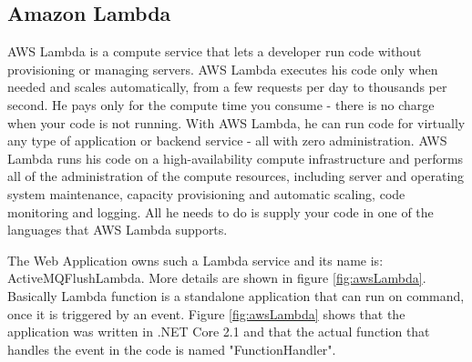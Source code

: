 \newpage

\subsection{Amazon Lambda}
\label{chap:04:03:07}

AWS Lambda is a compute service that lets a developer run code without provisioning or managing servers. AWS Lambda executes his code only when needed and scales automatically, from a few requests per day to thousands per second. He pays only for the compute time you consume - there is no charge when your code is not running. With AWS Lambda, he can run code for virtually any type of application or backend service - all with zero administration. AWS Lambda runs his code on a high-availability compute infrastructure and performs all of the administration of the compute resources, including server and operating system maintenance, capacity provisioning and automatic scaling, code monitoring and logging. All he needs to do is supply your code in one of the languages that AWS Lambda supports.\cite{aws-lambda}

The Web Application owns such a Lambda service and its name is: ActiveMQFlushLambda. More details are shown in figure \ref{fig:awsLambda}. Basically Lambda function is a standalone application that can run on command, once it is triggered by an event. Figure \ref{fig:awsLambda} shows that the application was written in .NET Core 2.1 and that the actual function that handles the event in the code is named "FunctionHandler".

